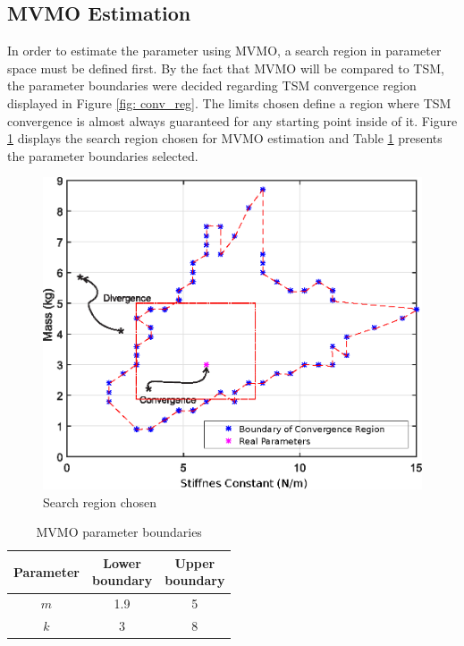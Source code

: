 \subsection{MVMO Estimation}

In order to estimate the parameter using MVMO, a search region in parameter space must be defined first. By the fact that MVMO will be compared to TSM, the parameter boundaries were decided regarding TSM convergence region displayed in Figure \ref{fig: conv_reg}. The limits chosen define a region where TSM convergence is almost always guaranteed for any starting point inside of it. Figure \ref{fig: spring_mass_MVMO_region} displays the search region chosen for MVMO estimation and Table \ref{tab: spring_mass_MVMO_bounds} presents the parameter boundaries selected.

\begin{figure}[h]
	\caption{Search region chosen}
	\begin{center}
		\includegraphics[scale=0.6]{Images/search_region_MVMO.eps}
	\end{center}
	\label{fig: spring_mass_MVMO_region}
\end{figure}

\begin{table}[!h]
	\centering
	\caption{MVMO parameter boundaries}
	\begin{tabular}{c|cc}
		Parameter & \shortstack{Lower \\ boundary} & \shortstack{Upper \\ boundary} \\\hline
		$m$ & 1.9 & 5 \\
		$k$ & 3 & 8 \\
	\end{tabular}
	\label{tab: spring_mass_MVMO_bounds}
\end{table}

